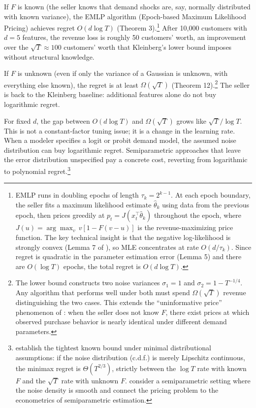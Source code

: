 If $F$ is known (the seller knows that demand shocks are, say, normally distributed with known variance), the EMLP algorithm (Epoch-based Maximum Likelihood Pricing) achieves regret $O(d \log T)$ (Theorem 3).\footnote{EMLP runs in doubling epochs of length $\tau_k = 2^{k-1}$. At each epoch boundary, the seller fits a maximum likelihood estimate $\hat{\theta}_k$ using data from the previous epoch, then prices greedily at $p_t = J(x_t^\top \hat{\theta}_k)$ throughout the epoch, where $J(u) = \arg\max_v \, v[1 - F(v - u)]$ is the revenue-maximizing price function. The key technical insight is that the negative log-likelihood is strongly convex (Lemma 7 of \citet{Xu2021}), so MLE concentrates at rate $O(d / \tau_k)$. Since regret is quadratic in the parameter estimation error (Lemma 5) and there are $O(\log T)$ epochs, the total regret is $O(d \log T)$.} After 10,000 customers with $d = 5$ features, the revenue loss is roughly 50 customers' worth, an improvement over the $\sqrt{T} \approx 100$ customers' worth that Kleinberg's lower bound imposes without structural knowledge.

If $F$ is unknown (even if only the variance of a Gaussian is unknown, with everything else known), the regret is at least $\Omega(\sqrt{T})$ (Theorem 12).\footnote{The lower bound constructs two noise variances $\sigma_1 = 1$ and $\sigma_2 = 1 - T^{-1/4}$. Any algorithm that performs well under both must spend $\Omega(\sqrt{T})$ revenue distinguishing the two cases. This extends the ``uninformative price'' phenomenon of \citet{Broder2012}: when the seller does not know $F$, there exist prices at which observed purchase behavior is nearly identical under different demand parameters.} The seller is back to the Kleinberg baseline: additional features alone do not buy logarithmic regret.

For fixed $d$, the gap between $O(d \log T)$ and $\Omega(\sqrt{T})$ grows like $\sqrt{T}/\log T$. This is not a constant-factor tuning issue; it is a change in the learning rate. When a modeler specifies a logit or probit demand model, the assumed noise distribution can buy logarithmic regret. Semiparametric approaches that leave the error distribution unspecified pay a concrete cost, reverting from logarithmic to polynomial regret.\footnote{\citet{Tullii2024} establish the tightest known bound under minimal distributional assumptions: if the noise distribution (c.d.f.) is merely Lipschitz continuous, the minimax regret is $\Theta(T^{2/3})$, strictly between the $\log T$ rate with known $F$ and the $\sqrt{T}$ rate with unknown $F$. \citet{Fan2024} consider a semiparametric setting where the noise density is smooth and connect the pricing problem to the econometrics of semiparametric estimation.}


